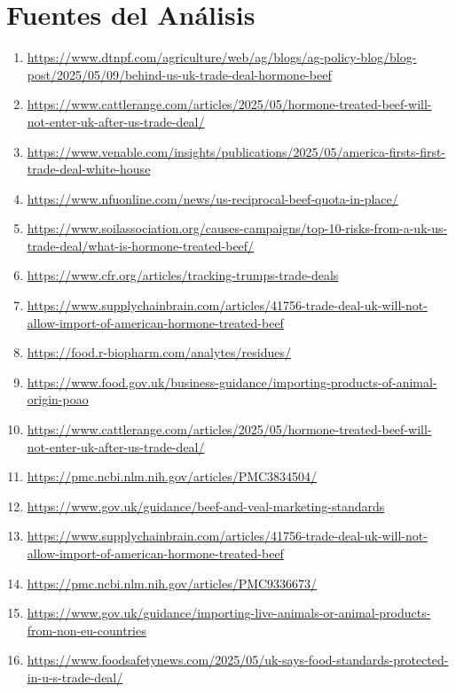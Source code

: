 \documentclass[10pt,a4paper]{article}
\begin{document}
\section*{Fuentes del Análisis}
    \begin{enumerate}[leftmargin=*]
            \item \url{ https://www.dtnpf.com/agriculture/web/ag/blogs/ag-policy-blog/blog-post/2025/05/09/behind-us-uk-trade-deal-hormone-beef }
            \item \url{ https://www.cattlerange.com/articles/2025/05/hormone-treated-beef-will-not-enter-uk-after-us-trade-deal/ }
            \item \url{ https://www.venable.com/insights/publications/2025/05/america-firsts-first-trade-deal-white-house }
            \item \url{ https://www.nfuonline.com/news/us-reciprocal-beef-quota-in-place/ }
            \item \url{ https://www.soilassociation.org/causes-campaigns/top-10-risks-from-a-uk-us-trade-deal/what-is-hormone-treated-beef/ }
            \item \url{ https://www.cfr.org/articles/tracking-trumps-trade-deals }
            \item \url{ https://www.supplychainbrain.com/articles/41756-trade-deal-uk-will-not-allow-import-of-american-hormone-treated-beef }
            \item \url{ https://food.r-biopharm.com/analytes/residues/ }
            \item \url{ https://www.food.gov.uk/business-guidance/importing-products-of-animal-origin-poao }
            \item \url{ https://www.cattlerange.com/articles/2025/05/hormone-treated-beef-will-not-enter-uk-after-us-trade-deal/ }
            \item \url{ https://pmc.ncbi.nlm.nih.gov/articles/PMC3834504/ }
            \item \url{ https://www.gov.uk/guidance/beef-and-veal-marketing-standards }
            \item \url{ https://www.supplychainbrain.com/articles/41756-trade-deal-uk-will-not-allow-import-of-american-hormone-treated-beef }
            \item \url{ https://pmc.ncbi.nlm.nih.gov/articles/PMC9336673/ }
            \item \url{ https://www.gov.uk/guidance/importing-live-animals-or-animal-products-from-non-eu-countries }
            \item \url{ https://www.foodsafetynews.com/2025/05/uk-says-food-standards-protected-in-u-s-trade-deal/ }

\end{enumerate}
\end{document}
